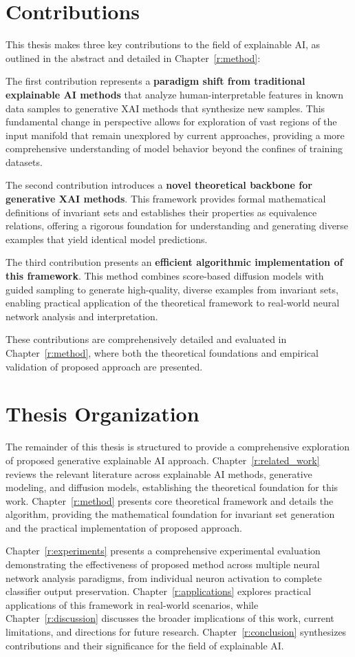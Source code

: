 \section{Contributions}

This thesis makes three key contributions to the field of explainable AI, as outlined in the abstract and detailed in Chapter~\ref{r:method}:

The first contribution represents a \textbf{paradigm shift from traditional explainable AI methods} that analyze human-interpretable features in known data samples to generative XAI methods that synthesize new samples. This fundamental change in perspective allows for exploration of vast regions of the input manifold that remain unexplored by current approaches, providing a more comprehensive understanding of model behavior beyond the confines of training datasets.

The second contribution introduces a \textbf{novel theoretical backbone for generative XAI methods}. This framework provides formal mathematical definitions of invariant sets and establishes their properties as equivalence relations, offering a rigorous foundation for understanding and generating diverse examples that yield identical model predictions.

The third contribution presents an \textbf{efficient algorithmic implementation of this framework}. This method combines score-based diffusion models with guided sampling to generate high-quality, diverse examples from invariant sets, enabling practical application of the theoretical framework to real-world neural network analysis and interpretation.

These contributions are comprehensively detailed and evaluated in Chapter~\ref{r:method}, where both the theoretical foundations and empirical validation of proposed approach are presented.

\section{Thesis Organization}

The remainder of this thesis is structured to provide a comprehensive exploration of proposed generative explainable AI approach. Chapter~\ref{r:related_work} reviews the relevant literature across explainable AI methods, generative modeling, and diffusion models, establishing the theoretical foundation for this work. Chapter~\ref{r:method} presents core theoretical framework and details the \method{} algorithm, providing the mathematical foundation for invariant set generation and the practical implementation of proposed approach.

Chapter~\ref{r:experiments} presents a comprehensive experimental evaluation demonstrating the effectiveness of proposed method across multiple neural network analysis paradigms, from individual neuron activation to complete classifier output preservation. Chapter~\ref{r:applications} explores practical applications of this framework in real-world scenarios, while Chapter~\ref{r:discussion} discusses the broader implications of this work, current limitations, and directions for future research. Chapter~\ref{r:conclusion} synthesizes contributions and their significance for the field of explainable AI.
